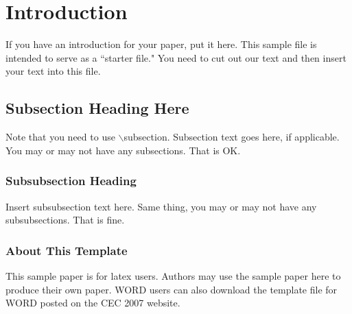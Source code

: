 \ResetPicDir{}

\section{Introduction}

If you have an introduction for your paper, put it here.
This sample file is intended to serve as a ``starter file."
You need to cut out our text and then insert your text into this file.

\subsection{Subsection Heading Here}
Note that you need to use $\backslash$subsection.
Subsection text goes here, if applicable.
You may or may not have any subsections. That is OK.

\subsubsection{Subsubsection Heading}
Insert subsubsection text here.
Same thing, you may or may not have any subsubsections. That is fine.

\subsubsection{About This Template}
This sample paper is for latex users. Authors may use the sample paper 
here to produce their own paper.
WORD users can also download the template file for WORD posted on the
CEC 2007 website.

